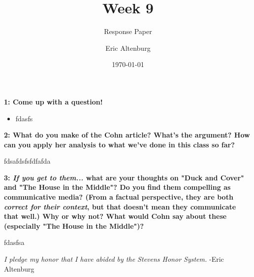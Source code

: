 \documentclass[12pt]{turabian-researchpaper}
\title{Week 9}
\subtitle{Response Paper}
\author{Eric Altenburg}
\date{\today}
\newcommand\question[2]{\noindent\textbf{#1: #2}}
\begin{document}
\maketitle

\question{1}{Come up with a question!}

	\begin{itemize}
		\item fdasfs
	\end{itemize}

\question{2}{What do you make of the Cohn article? What's the argument? How can you apply her analysis to what we've done in this class so far?}
	
	fdsafdsfsfdfafda

\question{3}{\textit{If you get to them...} what are your thoughts on "Duck and Cover" and "The House in the Middle"? Do you find them compelling as communicative media? (From a factual perspective, they are both \textit{correct for their context}, but that doesn't mean they communicate that well.) Why or why not? What would Cohn say about these (especially "The House in the Middle")?}

	fdasfsa

\vspace*{\fill}
\noindent\textit{I pledge my honor that I have abided by the Stevens Honor System.} -Eric Altenburg
\end{document}
